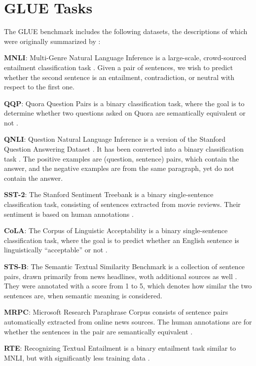 \documentclass[11pt]{article}
\begin{document}
\section{GLUE Tasks}
\label{appendix:c}

The GLUE benchmark includes the following
datasets, the descriptions of which were originally
summarized by \citet{wang-etal-2018-glue}:

\textbf{MNLI}: Multi-Genre Natural Language Inference
is a large-scale, crowd-sourced entailment classification task \cite{williams2018broadcoverage}. Given a pair of
sentences, we wish to predict whether the second sentence is an entailment, contradiction, or neutral with respect to the first one.

\textbf{QQP}: Quora Question Pairs is a binary classification task, where the goal is to determine whether two
questions asked on Quora are semantically equivalent or not \cite{qqpcite}.

\textbf{QNLI}: Question Natural Language Inference is
a version of the Stanford Question Answering
Dataset \cite{rajpurkar2016squad}. It has been
converted into a binary classification task \cite{wang-etal-2018-glue}. The positive examples are (question, sentence) pairs, which contain the answer, and the negative examples are from the same paragraph, yet do not contain the answer.

\textbf{SST-2}: The Stanford Sentiment Treebank is a
binary single-sentence classification task, consisting of sentences extracted from movie reviews. Their sentiment is based on human annotations \cite{socher-etal-2013-recursive}.

\textbf{CoLA}: The Corpus of Linguistic Acceptability is
a binary single-sentence classification task, where
the goal is to predict whether an English sentence
is linguistically “acceptable” or not \cite{warstadt-etal-2019-neural}.

\textbf{STS-B}: The Semantic Textual Similarity Benchmark is a collection of sentence pairs, drawn primarily from news headlines, woth additional sources as well \cite{cer-etal-2017-semeval}. They were annotated with a score from 1 to 5, which denotes how similar the two sentences are, when semantic meaning is considered.

\textbf{MRPC}: Microsoft Research Paraphrase Corpus
consists of sentence pairs automatically extracted
from online news sources. The human annotations are
for whether the sentences in the pair are semantically equivalent \cite{dolan-brockett-2005-automatically}.

\textbf{RTE}: Recognizing Textual Entailment is a binary entailment task similar to MNLI, but with significantly less training data \cite{10.1007/11736790_9, bar-haim-2006, 10.5555/1654536.1654538}.

 
\end{document}
